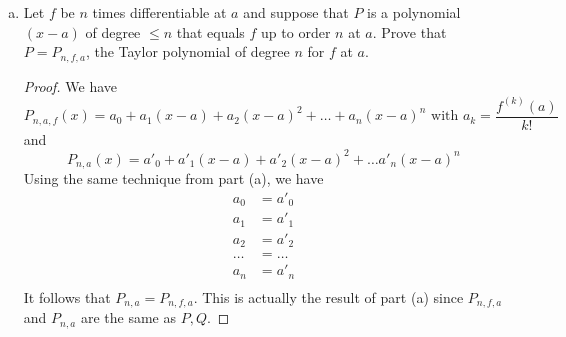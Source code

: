 \documentclass[10pt,letterpaper]{article}
\begin{document}
\begin{enumerate}[(a)]
\begin{proof}
	\end{proof}
		
		\item Let $f$ be $n$ times differentiable at $a$ and suppose that $P$ is a polynomial $(x - a)$
		of degree $\leq n$ that equals $f$ up to order $n$ at $a$. Prove that
		$P = P_{n,f,a}$, the Taylor polynomial of degree $n$ for $f$ at $a$.
		\begin{proof}
			We have
			$$P_{n,a,f}(x) = a_0 + a_1(x - a) + a_2(x - a)^2 + \ldots + a_n(x - a)^n  \text{ with } a_k = \dfrac{f^{(k)}(a)}{k!}$$
			and
			$$P_{n,a}(x) = a'_0 + a'_1(x - a) + a'_2(x - a)^2 + \ldots a'_n(x - a)^n$$
			Using the same technique from part (a), we have
			\begin{align*}
			a_0 &= a'_0 \\
			a_1 &= a'_1 \\
			a_2 &= a'_2 \\
			\ldots &= \ldots \\
			a_n &= a'_n \\
			\end{align*}
			It follows that $P_{n,a} = P_{n,f,a}$. This is actually the result of part (a) since $P_{n,f,a}$ and $P_{n,a}$ are the same as
			$P, Q$.
		\end{proof}
	\end{enumerate}
	
\end{document}
